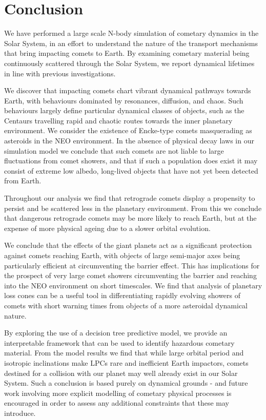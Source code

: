 \chapter{Conclusion}
\label{chap:conclusion}

We have performed a large scale N-body simulation of cometary dynamics in the Solar System, in an effort to understand the nature of the transport mechanisms that bring impacting comets to Earth. By examining cometary material being continuously scattered through the Solar System, we report dynamical lifetimes in line with previous investigations. 

We discover that impacting comets chart vibrant dynamical pathways towards Earth, with behaviours dominated by resonances, diffusion, and chaos. Such behaviours largely define particular dynamical classes of objects, such as the Centaurs travelling rapid and chaotic routes towards the inner planetary environment. We consider the existence of Encke-type comets masquerading as asteroids in the NEO environment. In the absence of physical decay laws in our simulation model we conclude that such comets are not liable to large fluctuations from comet showers, and that if such a population does exist it may consist of extreme low albedo, long-lived objects that have not yet been detected from Earth.

Throughout our analysis we find that retrograde comets display a propensity to persist and be scattered less in the planetary environment. From this we conclude that dangerous retrograde comets may be more likely to reach Earth, but at the expense of more physical ageing due to a slower orbital evolution.

We conclude that the effects of the giant planets act as a significant protection against comets reaching Earth, with objects of large semi-major axes being particularly efficient at circumventing the barrier effect. This has implications for the prospect of very large comet showers circumventing the barrier and reaching into the NEO environment on short timescales. We find that analysis of planetary loss cones can be a useful tool in differentiating rapidly evolving showers of comets with short warning times from objects of a more asteroidal dynamical nature.

By exploring the use of a decision tree predictive model, we provide an interpretable framework that can be used to identify hazardous cometary material. From the model results we find that while large orbital period and isotropic inclinations make LPCs rare and inefficient Earth impactors, comets destined for a collision with our planet may well already exist in our Solar System. Such a conclusion is based purely on dynamical grounds - and future work involving more explicit modelling of cometary physical processes is encouraged in order to assess any additional constraints that these may introduce.

